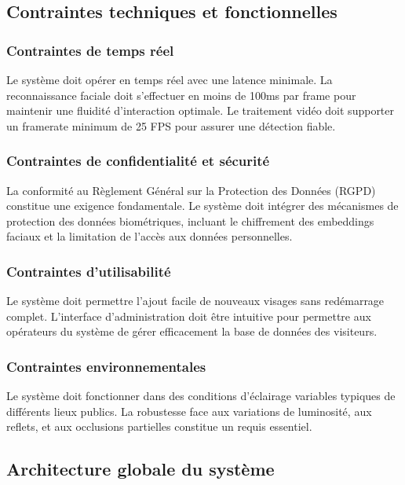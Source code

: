 \documentclass[12pt,a4paper]{article}
\begin{document}
\subsection{Contraintes techniques et fonctionnelles}

\subsubsection{Contraintes de temps réel}

Le système doit opérer en temps réel avec une latence minimale. La reconnaissance faciale doit s'effectuer en moins de 100ms par frame pour maintenir une fluidité d'interaction optimale. Le traitement vidéo doit supporter un framerate minimum de 25 FPS pour assurer une détection fiable.

\subsubsection{Contraintes de confidentialité et sécurité}

La conformité au Règlement Général sur la Protection des Données (RGPD) constitue une exigence fondamentale. Le système doit intégrer des mécanismes de protection des données biométriques, incluant le chiffrement des embeddings faciaux et la limitation de l'accès aux données personnelles.

\subsubsection{Contraintes d'utilisabilité}

Le système doit permettre l'ajout facile de nouveaux visages sans redémarrage complet. L'interface d'administration doit être intuitive pour permettre aux opérateurs du système de gérer efficacement la base de données des visiteurs.

\subsubsection{Contraintes environnementales}

Le système doit fonctionner dans des conditions d'éclairage variables typiques de différents lieux publics. La robustesse face aux variations de luminosité, aux reflets, et aux occlusions partielles constitue un requis essentiel.

\subsection{Architecture globale du système}
\end{document}
